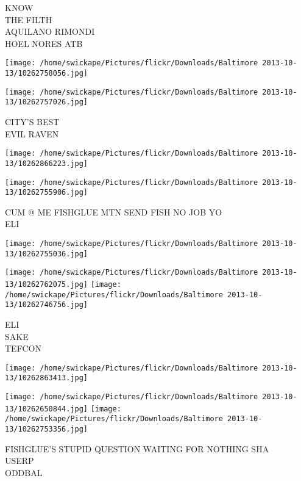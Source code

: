 \documentclass[10pt,letterpaper]{article}
\begin{document}
KNOW\\
THE FILTH\\
AQUILANO RIMONDI\\
HOEL NORES ATB\\
\pagebreak

\texttt{[image: /home/swickape/Pictures/flickr/Downloads/Baltimore 2013-10-13/10262758056.jpg]}

\vspace{0.25in}
\texttt{[image: /home/swickape/Pictures/flickr/Downloads/Baltimore 2013-10-13/10262757026.jpg]}

CITY'S BEST\\
EVIL RAVEN\\
\pagebreak

\texttt{[image: /home/swickape/Pictures/flickr/Downloads/Baltimore 2013-10-13/10262866223.jpg]}

\vspace{0.25in}
\texttt{[image: /home/swickape/Pictures/flickr/Downloads/Baltimore 2013-10-13/10262755906.jpg]}

CUM @ ME FISHGLUE MTN SEND FISH NO JOB YO\\
ELI\\
\pagebreak

\texttt{[image: /home/swickape/Pictures/flickr/Downloads/Baltimore 2013-10-13/10262755036.jpg]}

\vspace{0.25in}
\texttt{[image: /home/swickape/Pictures/flickr/Downloads/Baltimore 2013-10-13/10262762075.jpg]}
\texttt{[image: /home/swickape/Pictures/flickr/Downloads/Baltimore 2013-10-13/10262746756.jpg]}

ELI\\
SAKE\\
TEFCON\\
\pagebreak

\texttt{[image: /home/swickape/Pictures/flickr/Downloads/Baltimore 2013-10-13/10262863413.jpg]}

\vspace{0.25in}
\texttt{[image: /home/swickape/Pictures/flickr/Downloads/Baltimore 2013-10-13/10262650844.jpg]}
\texttt{[image: /home/swickape/Pictures/flickr/Downloads/Baltimore 2013-10-13/10262753356.jpg]}

FISHGLUE'S STUPID QUESTION WAITING FOR NOTHING SHA\\
USERP\\
ODDBAL\\
\pagebreak
\end{document}
